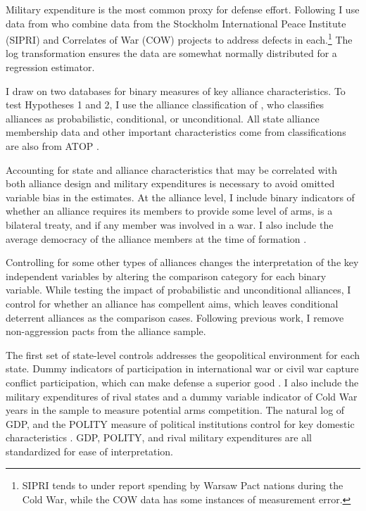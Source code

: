 \documentclass[12pt]{article}
\begin{document}
Military expenditure is the most common proxy for defense effort. Following\citet{DigiuseppePoast2016} I use data from \citet{Nordhausetal2012} who combine data from the Stockholm International Peace Institute (SIPRI) and Correlates of War (COW) projects to address defects in each.\footnote{SIPRI tends to under report spending by Warsaw Pact nations during the Cold War, while the COW data has some instances of measurement error.} The log transformation ensures the data are somewhat normally distributed for a regression estimator. 

I draw on two databases for binary measures of key alliance characteristics. To test Hypotheses 1 and 2, I use the alliance classification of \citet{Benson2012}, who classifies alliances as probabilistic, conditional, or unconditional. All state alliance membership data and other important characteristics come from classifications are also from ATOP \citep{Leedsetal2002}. 

Accounting for state and alliance characteristics that may be correlated with both alliance design and military expenditures is necessary to avoid omitted variable bias in the estimates. At the alliance level, I include binary indicators of whether an alliance requires its members to provide some level of arms, is a bilateral treaty, and if any member was involved in a war. I also include the average democracy of the alliance members at the time of formation \citep{Chibaetal2015}. 

Controlling for some other types of alliances changes the interpretation of the key independent variables by altering the comparison category for each binary variable. While testing the impact of probabilistic and unconditional alliances, I control for whether an alliance has compellent aims, which leaves conditional deterrent alliances as the comparison cases. Following previous work, I remove non-aggression pacts from the alliance sample. 

The first set of state-level controls addresses the geopolitical environment for each state. Dummy indicators of participation in international war or civil war capture conflict participation, which can make defense a superior good \citep{OlsonZeckhauser1966}. I also include the military expenditures of rival states and a dummy variable indicator of Cold War years in the sample to measure potential arms competition. The natural log of GDP, and the POLITY measure of political institutions control for key domestic characteristics \citep{FordhamWalker2005}. GDP, POLITY, and rival military expenditures are all standardized for ease of interpretation. 
\end{document}
